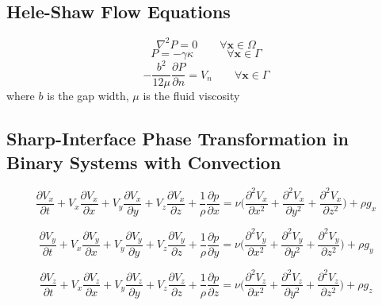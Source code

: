 \documentclass[12pt]{extarticle}
\begin{document}
\subsection*{Hele-Shaw Flow Equations}
\begin{equation}
\nabla^{2} P = 0 \quad \quad \forall \textbf{x} \in \Omega
\end{equation}
\begin{equation}
P = - \gamma \kappa \quad \quad \quad \forall \textbf{x} \in \Gamma
\end{equation}
\begin{equation}
- \frac{b^{2}}{12 \mu} \frac{\partial P}{\partial n} = V_{n}  \quad \quad \forall \textbf{x} \in \Gamma
\end{equation}
where $b$ is the gap width, $\mu$ is the fluid viscosity

\clearpage
\subsection*{Sharp-Interface Phase Transformation in Binary Systems with Convection}
\begin{equation}
\frac{\partial V_{x}}{\partial t} + V_{x} \frac{\partial V_{x}}{\partial x} + V_{y} \frac{\partial V_{x}}{\partial y} + V_{z} \frac{\partial V_{x}}{\partial z} + \frac{1}{\rho} \frac{\partial p}{\partial x} = \nu \Big( \frac{\partial^{2} V_{x}}{\partial x^{2}}+\frac{\partial^{2} V_{x}}{\partial y^{2}}+\frac{\partial^{2} V_{x}}{\partial z^{2}} \Big) + \rho g_{x}
\end{equation}

\begin{equation}
\frac{\partial V_{y}}{\partial t} + V_{x} \frac{\partial V_{y}}{\partial x} + V_{y} \frac{\partial V_{y}}{\partial y} + V_{z} \frac{\partial V_{y}}{\partial z} + \frac{1}{\rho} \frac{\partial p}{\partial y} = \nu \Big( \frac{\partial^{2} V_{y}}{\partial x^{2}}+\frac{\partial^{2} V_{y}}{\partial y^{2}}+\frac{\partial^{2} V_{y}}{\partial z^{2}} \Big) + \rho g_{y}
\end{equation}

\begin{equation}
\frac{\partial V_{z}}{\partial t} + V_{x} \frac{\partial V_{z}}{\partial x} + V_{y} \frac{\partial V_{z}}{\partial y} + V_{z} \frac{\partial V_{z}}{\partial z} + \frac{1}{\rho} \frac{\partial p}{\partial z} = \nu \Big( \frac{\partial^{2} V_{z}}{\partial x^{2}}+\frac{\partial^{2} V_{z}}{\partial y^{2}}+\frac{\partial^{2} V_{z}}{\partial z^{2}} \Big) + \rho g_{z}
\end{equation}
\end{document}
